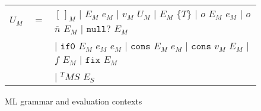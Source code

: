 \begin{figure}[p]
\begin{tabular}{lcl}
\vspace{5pt}

$U_{M}$ & $=$ & $[\,]_{M}$ $\vert$ $E_{M}$ $e_{M}$ $\vert$ $v_{M}$ $U_{M}$ $\vert$ $E_{M}$ $\lbrace T\rbrace$ $\vert$ $o$ $E_{M}$ $e_{M}$ $\vert$ $o$ $\overline{n}$ $E_{M}$ $\vert$ $\mathtt{null?}$ $E_{M}$ \\

\vspace{5pt}

&& $\vert$ $\mathtt{if0}$ $E_{M}$ $e_{M}$ $e_{M}$ $\vert$ $\mathtt{cons}$ $E_{M}$ $e_{M}$ $\vert$ $\mathtt{cons}$ $v_{M}$ $E_{M}$ $\vert$ $f$ $E_{M}$ $\vert$ $\mathtt{fix}$ $E_{M}$ \\

\vspace{5pt}

&& $\vert$ $^{T}MS$ $E_{S}$
\end{tabular}
\caption{ML grammar and evaluation contexts}
\label{mg}
\end{figure}